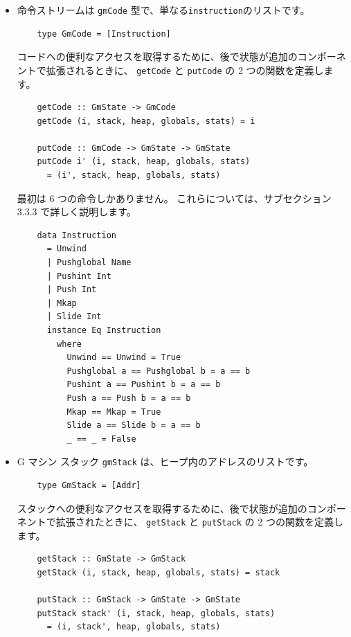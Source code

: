 \documentclass{jbook}
\begin{document}
\begin{itemize}
	\item 命令ストリームは \texttt{gmCode} 型で、単なる\texttt{instruction}のリストです。

	      \begin{verbatim}
    type GmCode = [Instruction]
  \end{verbatim}

	      コードへの便利なアクセスを取得するために、後で状態が追加のコンポーネントで拡張されるときに、
	      \texttt{getCode} と \texttt{putCode} の 2 つの関数を定義します。


	      \begin{verbatim}
    getCode :: GmState -> GmCode
    getCode (i, stack, heap, globals, stats) = i
  
    putCode :: GmCode -> GmState -> GmState
    putCode i' (i, stack, heap, globals, stats)
      = (i', stack, heap, globals, stats)
  \end{verbatim}

	      最初は 6 つの命令しかありません。
	      これらについては、サブセクション 3.3.3 で詳しく説明します。

	      \begin{verbatim}
    data Instruction
      = Unwind
      | Pushglobal Name
      | Pushint Int
      | Push Int
      | Mkap
      | Slide Int
      instance Eq Instruction
        where
          Unwind == Unwind = True
          Pushglobal a == Pushglobal b = a == b
          Pushint a == Pushint b = a == b
          Push a == Push b = a == b
          Mkap == Mkap = True
          Slide a == Slide b = a == b
          _ == _ = False
  \end{verbatim}

	\item G マシン スタック \texttt{gmStack} は、ヒープ内のアドレスのリストです。

	      \begin{verbatim}
    type GmStack = [Addr]
  \end{verbatim}

	      スタックへの便利なアクセスを取得するために、後で状態が追加のコンポーネントで拡張されたときに、
	      \texttt{getStack} と \texttt{putStack} の 2 つの関数を定義します。

	      \begin{verbatim}
    getStack :: GmState -> GmStack
    getStack (i, stack, heap, globals, stats) = stack

    putStack :: GmStack -> GmState -> GmState
    putStack stack' (i, stack, heap, globals, stats)
      = (i, stack', heap, globals, stats)
  \end{verbatim}


\end{itemize}
\end{document}
